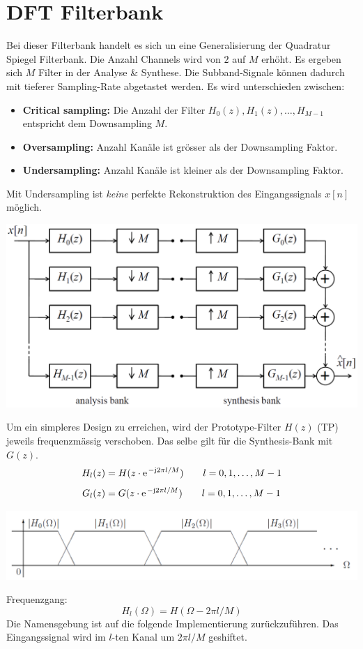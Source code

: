 \section{DFT Filterbank}
Bei dieser Filterbank handelt es sich un eine Generalisierung der Quadratur Spiegel
Filterbank. Die Anzahl Channels wird von $2$ auf $M$ erhöht. Es ergeben sich $M$ 
Filter in der Analyse \& Synthese. Die Subband-Signale können dadurch mit tieferer 
Sampling-Rate abgetastet werden. Es wird unterschieden zwischen:
\begin{itemize}[noitemsep,topsep=3pt]
	\item \textbf{Critical sampling:} Die Anzahl der Filter $H_0(z), H_1(z), \ldots, H_
{M-1}$ entspricht dem Downsampling $M$.
	\item \textbf{Oversampling:} Anzahl Kanäle ist grösser als der Downsampling Faktor.
	\item \textbf{Undersampling:} Anzahl Kanäle ist kleiner als der Downsampling Faktor. 
\end{itemize}
Mit Undersampling ist \emph{keine} perfekte Rekonstruktion des Eingangssignals $x[n]$ 
möglich.
\begin{center}
	\includegraphics[width=.6\textwidth]{../fig/critical_sampled}
\end{center}
Um ein simpleres Design zu erreichen, wird der Prototype-Filter $H(z)$ (TP) jeweils 
frequenzmässig verschoben. Das selbe gilt für die Synthesis-Bank mit $G(z)$. 
\[ H_l(z) = H(z\cdot\e^{-\im 2\pi l/M}) \qquad l=0,1,\ldots,M-1 \]
\[ G_l(z) = G(z\cdot\e^{-\im 2\pi l/M}) \qquad l=0,1,\ldots,M-1 \]
\begin{center}
	\includegraphics[width=.7\textwidth]{../fig/dft_bank_freq.png}
\end{center}
Frequenzgang:
\[ H_l(\Omega) = H(\Omega-2\pi l/M) \]
Die Namensgebung ist auf die folgende Implementierung zurückzuführen. Das Eingangssignal
wird im $l$-ten Kanal um $2\pi l/M$ geshiftet.
